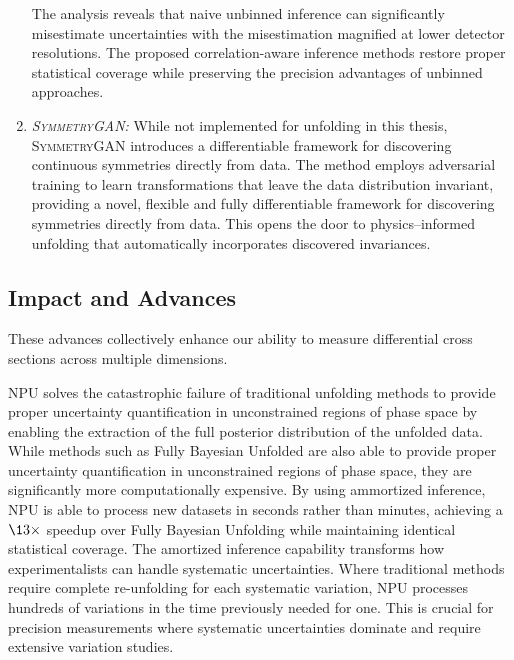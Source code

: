 \begin{enumerate}
            The analysis reveals that naive unbinned inference can significantly misestimate uncertainties with the misestimation magnified at lower detector resolutions.
            The proposed correlation-aware inference methods restore proper statistical coverage while preserving the precision advantages of unbinned approaches.
            \item \emph{\textsc{SymmetryGAN}:} While not implemented for unfolding in this thesis, \textsc{SymmetryGAN} introduces a differentiable framework for discovering continuous symmetries directly from data.
            The method employs adversarial training to learn transformations that leave the data distribution invariant, providing a novel, flexible and fully differentiable framework for discovering symmetries directly from data.
            This opens the door to physics--informed unfolding that automatically incorporates discovered invariances.
        \end{enumerate}
    \subsection{Impact and Advances}
        These advances collectively enhance our ability to measure differential cross sections across multiple dimensions.
        
        NPU solves the catastrophic failure of traditional unfolding methods to provide proper uncertainty quantification in unconstrained regions of phase space by enabling the extraction of the full posterior distribution of the unfolded data.
        While methods such as Fully Bayesian Unfolded are also able to provide proper uncertainty quantification in unconstrained regions of phase space, they are significantly more computationally expensive.
        By using ammortized inference, NPU is able to process new datasets in seconds rather than minutes, achieving a \(\13\times\) speedup over Fully Bayesian Unfolding while maintaining identical statistical coverage.
        The amortized inference capability transforms how experimentalists can handle systematic uncertainties.
        Where traditional methods require complete re-unfolding for each systematic variation, NPU processes hundreds of variations in the time previously needed for one.
        This is crucial for precision measurements where systematic uncertainties dominate and require extensive variation studies.

